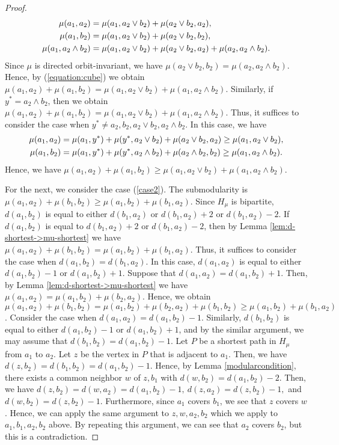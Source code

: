 \documentclass[11pt]{article}
\theoremstyle{definition}
\begin{document}
\begin{proof}
\begin{align}
\label{equation:cube}
    \mu(a_1,a_2)&=\mu(a_1,a_2\vee b_2)+\mu(a_2\vee b_2,a_2),\notag\\
    \mu(a_1,b_2)&=\mu(a_1,a_2\vee b_2)+\mu(a_2\vee b_2,b_2), \notag \\
    \mu(a_1,a_2\wedge b_2)&=\mu(a_1,a_2\vee b_2)+\mu(a_2\vee b_2,a_2)+\mu(a_2,a_2\wedge b_2).
\end{align}
Since $\mu$ is directed orbit-invariant, we have $\mu(a_2\vee b_2,b_2)=\mu(a_2,a_2\wedge b_2)$. Hence, by (\ref{equation:cube}) we obtain $\mu(a_1,a_2)+\mu(a_1,b_2)=\mu(a_1,a_2\vee b_2)+\mu(a_1,a_2\wedge b_2)$. Similarly, if $y^*=a_2\wedge b_2$, then we obtain $\mu(a_1,a_2)+\mu(a_1,b_2)=\mu(a_1,a_2\vee b_2)+\mu(a_1,a_2\wedge b_2)$. Thus, it suffices to consider the case when $y^*\neq a_2,b_2,a_2\vee b_2,a_2\wedge b_2$. In this case, we have
\begin{align}
    \mu(a_1,a_2)&=\mu(a_1,y^*)+\mu(y^*,a_2\vee b_2)+\mu(a_2\vee b_2,a_2)\geq \mu(a_1,a_2\vee b_2),\notag\\ 
    \mu(a_1,b_2)&=\mu(a_1,y^*)+\mu(y^*,a_2\wedge b_2)+\mu(a_2\wedge b_2,b_2)\geq \mu(a_1,a_2\wedge b_2).
\end{align}
Hence, we have $\mu(a_1,a_2)+\mu(a_1,b_2)\geq \mu(a_1,a_2\vee b_2)+\mu(a_1,a_2\wedge b_2)$.

For the next, we consider the case (\ref{case2}). The submodularity is $\mu(a_1,a_2)+\mu(b_1,b_2)\geq \mu(a_1,b_2)+\mu(b_1,a_2)$. Since $H_\mu$ is bipartite, $d(a_1,b_2)$ is equal to  either $d(b_1,a_2)$ or $d(b_1,a_2)+2$ or $d(b_1,a_2)-2$. If $d(a_1,b_2)$ is equal to $d(b_1,a_2)+2$ or $d(b_1,a_2)-2$, then by Lemma \ref{lem:d-shortest->mu-shortest} we have $\mu(a_1,a_2)+\mu(b_1,b_2)= \mu(a_1,b_2)+\mu(b_1,a_2)$. Thus, it suffices to consider the case when $d(a_1,b_2)=d(b_1,a_2)$. In this case, $d(a_1,a_2)$ is equal to either $d(a_1,b_2)-1$ or $d(a_1,b_2)+1$. Suppose that $d(a_1,a_2)=d(a_1,b_2)+1$. Then, by Lemma \ref{lem:d-shortest->mu-shortest} we have $\mu(a_1,a_2)=\mu(a_1,b_2)+\mu(b_2,a_2)$. Hence, we obtain $\mu(a_1,a_2)+\mu(b_1,b_2)=\mu(a_1,b_2)+\mu(b_2,a_2)+\mu(b_1,b_2)\geq \mu(a_1,b_2)+\mu(b_1,a_2)$. Consider the case when $d(a_1,a_2)=d(a_1,b_2)-1$. Similarly, $d(b_1,b_2)$ is equal to either $d(a_1,b_2)-1$ or $d(a_1,b_2)+1$, and by the similar argument, we may assume that $d(b_1,b_2)=d(a_1,b_2)-1$. Let $P$ be a shortest path in $H_\mu$ from $a_1$ to $a_2$. Let $z$ be the vertex in $P$ that is adjacent to $a_1$. Then, we have $d(z,b_2)=d(b_1,b_2)=d(a_1,b_2)-1$. Hence, by Lemma \ref{modularcondition}, there exists a common neighbor $w$ of $z,b_1$ with $d(w,b_2)=d(a_1,b_2)-2$. Then, we have $d(z,b_2)=d(w,a_2)=d(a_1,b_2)-1,\ d(z,a_2)=d(z,b_2)-1,$ and $d(w,b_2)=d(z,b_2)-1$. Furthermore, since $a_1$ covers $b_1$, we see that $z$ covers $w$. Hence, we can apply the same argument to $z,w,a_2,b_2$ which we apply to $a_1,b_1,a_2,b_2$ above. 
By repeating this argument, we can see that $a_2$ covers $b_2$, but this is a contradiction.
\end{proof}
\end{document}
